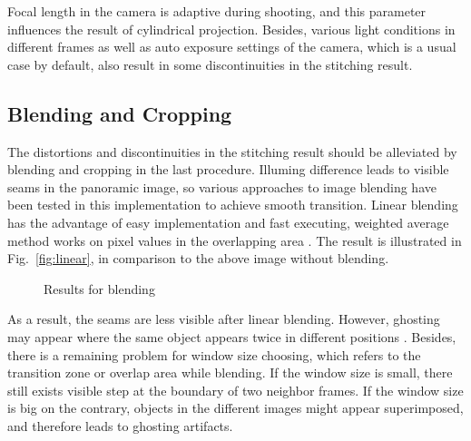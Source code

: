 \documentclass[runningheads]{llncs}
\begin{document}
Focal length in the camera is adaptive during shooting, and this parameter influences the result of cylindrical projection. Besides, various light conditions in different frames as well as auto exposure settings of the camera, which is a usual case by default, also result in some discontinuities in the stitching result.

\subsection{Blending and Cropping}

The distortions and discontinuities in the stitching result should be alleviated by blending and cropping in the last procedure. Illuming difference leads to visible seams in the panoramic image, so various approaches to image blending have been tested in this implementation to achieve smooth transition. Linear blending has the advantage of easy implementation and fast executing, weighted average method works on pixel values in the overlapping area \cite{li2008automatic}. The result is illustrated in Fig.~\ref{fig:linear}, in comparison to the above image without blending.

\begin{figure}[h!]
\centering
{}



\caption{Results for blending}
\end{figure}

As a result, the seams are less visible after linear blending. However, ghosting may appear where the same object appears twice in different positions \cite{juan2010surf}. Besides, there is a remaining problem for window size choosing, which refers to the transition zone or overlap area while blending. If the window size is small, there still exists visible step at the boundary of two neighbor frames. If the window size is big on the contrary, objects in the different images might appear superimposed, and therefore leads to ghosting artifacts.
\end{document}
